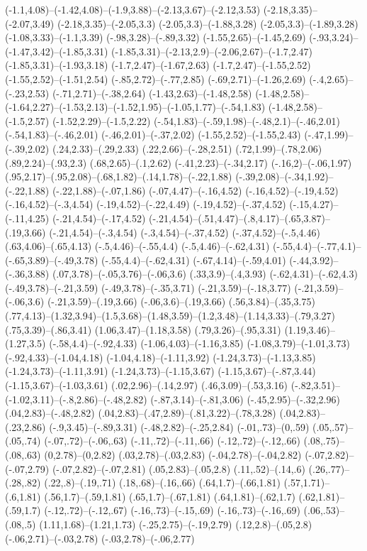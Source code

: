 {(-1.1,4.08)--(-1.42,4.08)--(-1.9,3.88)--(-2.13,3.67)--(-2.12,3.53) (-2.18,3.35)--(-2.07,3.49) (-2.18,3.35)--(-2.05,3.3) (-2.05,3.3)--(-1.88,3.28) (-2.05,3.3)--(-1.89,3.28) (-1.08,3.33)--(-1.1,3.39) (-.98,3.28)--(-.89,3.32) (-1.55,2.65)--(-1.45,2.69) (-.93,3.24)--(-1.47,3.42)--(-1.85,3.31) (-1.85,3.31)--(-2.13,2.9)--(-2.06,2.67)--(-1.7,2.47) (-1.85,3.31)--(-1.93,3.18) (-1.7,2.47)--(-1.67,2.63) (-1.7,2.47)--(-1.55,2.52) (-1.55,2.52)--(-1.51,2.54) (-.85,2.72)--(-.77,2.85) (-.69,2.71)--(-1.26,2.69) (-.4,2.65)--(-.23,2.53) (-.71,2.71)--(-.38,2.64) (-1.43,2.63)--(-1.48,2.58) (-1.48,2.58)--(-1.64,2.27)--(-1.53,2.13)--(-1.52,1.95)--(-1.05,1.77)--(-.54,1.83) (-1.48,2.58)--(-1.5,2.57) (-1.52,2.29)--(-1.5,2.22) (-.54,1.83)--(-.59,1.98)--(-.48,2.1)--(-.46,2.01) (-.54,1.83)--(-.46,2.01) (-.46,2.01)--(-.37,2.02) (-1.55,2.52)--(-1.55,2.43) (-.47,1.99)--(-.39,2.02) (.24,2.33)--(.29,2.33) (.22,2.66)--(-.28,2.51) (.72,1.99)--(.78,2.06) (.89,2.24)--(.93,2.3) (.68,2.65)--(.1,2.62) (-.41,2.23)--(-.34,2.17) (-.16,2)--(-.06,1.97) (.95,2.17)--(.95,2.08)--(.68,1.82)--(.14,1.78)--(-.22,1.88) (-.39,2.08)--(-.34,1.92)--(-.22,1.88) (-.22,1.88)--(-.07,1.86) (-.07,4.47)--(-.16,4.52) (-.16,4.52)--(-.19,4.52) (-.16,4.52)--(-.3,4.54) (-.19,4.52)--(-.22,4.49) (-.19,4.52)--(-.37,4.52) (-.15,4.27)--(-.11,4.25) (-.21,4.54)--(-.17,4.52) (-.21,4.54)--(.51,4.47)--(.8,4.17)--(.65,3.87)--(.19,3.66) (-.21,4.54)--(-.3,4.54) (-.3,4.54)--(-.37,4.52) (-.37,4.52)--(-.5,4.46) (.63,4.06)--(.65,4.13) (-.5,4.46)--(-.55,4.4) (-.5,4.46)--(-.62,4.31) (-.55,4.4)--(-.77,4.1)--(-.65,3.89)--(-.49,3.78) (-.55,4.4)--(-.62,4.31) (-.67,4.14)--(-.59,4.01) (-.44,3.92)--(-.36,3.88) (.07,3.78)--(-.05,3.76)--(-.06,3.6) (.33,3.9)--(.4,3.93) (-.62,4.31)--(-.62,4.3) (-.49,3.78)--(-.21,3.59) (-.49,3.78)--(-.35,3.71) (-.21,3.59)--(-.18,3.77) (-.21,3.59)--(-.06,3.6) (-.21,3.59)--(.19,3.66) (-.06,3.6)--(.19,3.66) (.56,3.84)--(.35,3.75) (.77,4.13)--(1.32,3.94)--(1.5,3.68)--(1.48,3.59)--(1.2,3.48)--(1.14,3.33)--(.79,3.27) (.75,3.39)--(.86,3.41) (1.06,3.47)--(1.18,3.58) (.79,3.26)--(.95,3.31) (1.19,3.46)--(1.27,3.5) (-.58,4.4)--(-.92,4.33) (-1.06,4.03)--(-1.16,3.85) (-1.08,3.79)--(-1.01,3.73) (-.92,4.33)--(-1.04,4.18) (-1.04,4.18)--(-1.11,3.92) (-1.24,3.73)--(-1.13,3.85) (-1.24,3.73)--(-1.11,3.91) (-1.24,3.73)--(-1.15,3.67) (-1.15,3.67)--(-.87,3.44) (-1.15,3.67)--(-1.03,3.61) (.02,2.96)--(.14,2.97) (.46,3.09)--(.53,3.16) (-.82,3.51)--(-1.02,3.11)--(-.8,2.86)--(-.48,2.82) (-.87,3.14)--(-.81,3.06) (-.45,2.95)--(-.32,2.96) (.04,2.83)--(-.48,2.82) (.04,2.83)--(.47,2.89)--(.81,3.22)--(.78,3.28) (.04,2.83)--(.23,2.86) (-.9,3.45)--(-.89,3.31) (-.48,2.82)--(-.25,2.84) (-.01,.73)--(0,.59) (.05,.57)--(.05,.74) (-.07,.72)--(-.06,.63) (-.11,.72)--(-.11,.66) (-.12,.72)--(-.12,.66) (.08,.75)--(.08,.63) (0,2.78)--(0,2.82) (.03,2.78)--(.03,2.83) (-.04,2.78)--(-.04,2.82) (-.07,2.82)--(-.07,2.79) (-.07,2.82)--(-.07,2.81) (.05,2.83)--(.05,2.8) (.11,.52)--(.14,.6) (.26,.77)--(.28,.82) (.22,.8)--(.19,.71) (.18,.68)--(.16,.66) (.64,1.7)--(.66,1.81) (.57,1.71)--(.6,1.81) (.56,1.7)--(.59,1.81) (.65,1.7)--(.67,1.81) (.64,1.81)--(.62,1.7) (.62,1.81)--(.59,1.7) (-.12,.72)--(-.12,.67) (-.16,.73)--(-.15,.69) (-.16,.73)--(-.16,.69) (.06,.53)--(.08,.5) (1.11,1.68)--(1.21,1.73) (-.25,2.75)--(-.19,2.79) (.12,2.8)--(.05,2.8) (-.06,2.71)--(-.03,2.78) (-.03,2.78)--(-.06,2.77) }
